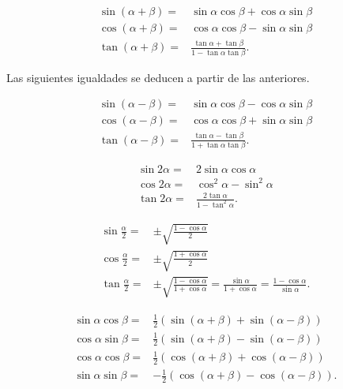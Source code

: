 \begin{ftheorem}
\normalfont 
\[
\begin{split}
	\sin\left(\alpha + \beta \right) = & \sin\alpha\cos\beta + \cos\alpha \sin\beta \\
	\cos\left(\alpha + \beta \right) = & \cos \alpha \cos \beta - \sin \alpha \sin \beta \\
	\tan\left(\alpha + \beta \right) = & \frac{\tan \alpha + \tan \beta }{1 - \tan \alpha \tan \beta }.
\end{split}
\]
\end{ftheorem}
Las siguientes igualdades se deducen a partir de las anteriores.
\begin{ftheorem}
\normalfont 
\[
\begin{split}
	\sin\left(\alpha - \beta \right) = & \sin\alpha\cos\beta - \cos\alpha \sin\beta \\
	\cos\left(\alpha - \beta \right) = & \cos \alpha \cos \beta + \sin \alpha \sin \beta \\
	\tan\left(\alpha - \beta \right) = & \frac{\tan \alpha - \tan \beta }{1 + \tan \alpha \tan \beta }.
\end{split}
\]
\end{ftheorem}
\begin{ftheorem}
\normalfont 
\[
\begin{split}
	\sin 2\alpha = & 2 \sin \alpha \cos \alpha \\
	\cos 2 \alpha = & \cos^{2}\alpha - \sin ^{2}\alpha \\
	\tan 2 \alpha = & \frac{2\tan \alpha }{1 - \tan^{2}\alpha }.
\end{split}
\]
\end{ftheorem}
\begin{ftheorem}
\normalfont 
\[
\begin{split}
	\sin \frac{\alpha }{2} = & \pm \sqrt{\frac{1 - \cos \alpha }{2}} \\
	\cos \frac{\alpha }{2} = & \pm \sqrt{\frac{1 + \cos \alpha }{2}} \\
	\tan \frac{\alpha }{2} = & \pm \sqrt{\frac{1 - \cos \alpha }{1 + \cos \alpha }} = \frac{\sin \alpha }{1 + \cos \alpha } = \frac{1 - \cos \alpha }{\sin \alpha }.
\end{split}
\]
\end{ftheorem}
\begin{ftheorem}
\normalfont 
\[
\begin{split}
	\sin\alpha \cos \beta = & \frac{1}{2}\left(\sin\left(\alpha + \beta \right) + \sin \left(\alpha - \beta \right)\right) \\
	\cos \alpha \sin \beta = & \frac{1}{2}\left(\sin\left(\alpha + \beta \right) - \sin\left(\alpha - \beta \right)\right) \\
	\cos\alpha \cos \beta = & \frac{1}{2}\left(\cos\left(\alpha + \beta \right) + \cos \left(\alpha - \beta \right)\right) \\
	\sin \alpha \sin \beta = & - \frac{1}{2}\left(\cos\left(\alpha + \beta \right) - \cos\left(\alpha - \beta \right)\right).
\end{split}
\]
\end{ftheorem}
